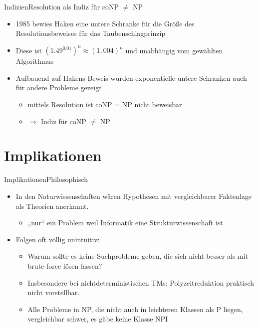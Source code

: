 \documentclass[ignorenonframetext,]{beamer}
\begin{document}
\begin{frame}{Indizien}{Resolution als Indiz für coNP $\neq$ NP}

\begin{itemize}
\itemsep1pt\parskip0pt
\item
  1985 bewies Haken eine untere Schranke für die Größe des
  Resolutionsbeweises für das Taubenschlagprinzip
\item
  Diese ist $(1.49^{0.01})^n \approx (1,004)^n$ und unabhängig vom
  gewählten Algorithmus
\item
  Aufbauend auf Hakens Beweis wurden exponentielle untere Schranken auch
  für andere Probleme gezeigt

  \begin{itemize}
  \itemsep1pt\parskip0pt
  \item
    mittels Resolution ist coNP = NP nicht beweisbar
  \item
    $\Rightarrow$ Indiz für coNP $\neq$ NP
  \end{itemize}
\end{itemize}

\end{frame}

\section{Implikationen}\label{implikationen}

\begin{frame}{Implikationen}{Philosophisch}

\begin{itemize}
\itemsep1pt\parskip0pt
\item
  In den Naturwissenschaften wären Hypothesen mit vergleichbarer
  Faktenlage als Theorien anerkannt.

  \begin{itemize}
  \itemsep1pt\parskip0pt
  \item
    „nur`` ein Problem weil Informatik eine Strukturwissenschaft ist
  \end{itemize}
\item
  Folgen oft völlig unintuitiv:

  \begin{itemize}
  \itemsep1pt\parskip0pt
  \item
    Warum sollte es keine Suchprobleme geben, die sich nicht besser als
    mit brute-force lösen lassen?
  \item
    Insbesondere bei nichtdeterministischen TMs: Polyzeitreduktion
    praktisch nicht vorstellbar.
  \item
    Alle Probleme in NP, die nicht auch in leichteren Klassen als P liegen, vergleichbar
    schwer, es gäbe keine Klasse NPI
  \end{itemize}
\end{itemize}

\end{frame}
\end{document}
